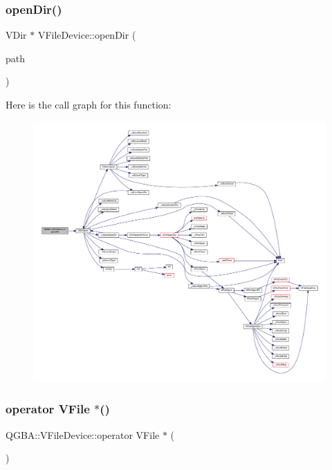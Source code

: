 \subsubsection{\texorpdfstring{open\+Dir()}{openDir()}}
{\footnotesize\ttfamily V\+Dir $\ast$ V\+File\+Device\+::open\+Dir (\begin{DoxyParamCaption}\item[{const Q\+String \&}]{path }\end{DoxyParamCaption})\hspace{0.3cm}{\ttfamily [static]}}

Here is the call graph for this function\+:
\nopagebreak
\begin{figure}[H]
\begin{center}
\leavevmode
\includegraphics[width=350pt]{class_q_g_b_a_1_1_v_file_device_a79750e0a06f29d76808607b0624b2e43_cgraph}
\end{center}
\end{figure}
\mbox{\label{class_q_g_b_a_1_1_v_file_device_a0d4c7a788715c253527c224aa77bc8cd}} 
\subsubsection{\texorpdfstring{operator V\+File $\ast$()}{operator VFile *()}}
{\footnotesize\ttfamily Q\+G\+B\+A\+::\+V\+File\+Device\+::operator V\+File $\ast$ (\begin{DoxyParamCaption}{ }\end{DoxyParamCaption})\hspace{0.3cm}{\ttfamily [inline]}}

